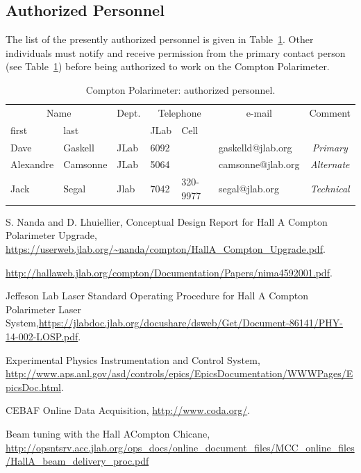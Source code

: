 \subsection{Authorized Personnel}
The list
of the presently authorized personnel is given in Table~\ref{tab:compton:personnel}.
Other individuals must notify and receive permission from
the primary contact person (see Table~\ref{tab:compton:personnel}) before being authorized to work on the Compton Polarimeter.

\begin{table}[ht]
\begin{center}
\begin{tabular}{|ll|l|l|l|l|c|} \hline
  \multicolumn{2}{|c|}{Name} & Dept. & \multicolumn{2}{c|}{Telephone} &
  \multicolumn{1}{c|}{e-mail} & Comment \\
  \cline{4-5}
    first & last & & JLab &  Cell&  & \\
\hline
 {Dave } & {Gaskell} & JLab   & 6092  &   & gaskelld@jlab.org     & \it Primary     \\
   Alexandre & Camsonne           & JLab   & 5064 &  & camsonne@jlab.org     & \it Alternate \\
   Jack   &  Segal           & Jlab   & 7042  &  320-9977& segal@jlab.org     & \it Technical \\
 \hline
\end{tabular}  
\end{center}
\caption[compton Polarimeter: authorized personnel]{
   Compton Polarimeter: authorized personnel. }
\label{tab:compton:personnel}
\end{table}

%
\begin{thebibliography}{99}
 S. Nanda and D. Lhuiellier, Conceptual Design Report  for 
Hall A Compton Polarimeter Upgrade, \url{https://userweb.jlab.org/~nanda/compton/HallA_Compton_Upgrade.pdf}.

 \url{http://hallaweb.jlab.org/compton/Documentation/Papers/nima4592001.pdf}.

 Jeffeson Lab Laser Standard Operating Procedure for Hall A Compton Polarimeter Laser System,\url{https://jlabdoc.jlab.org/docushare/dsweb/Get/Document-86141/PHY-14-002-LOSP.pdf}.

 Experimental Physics Instrumentation and Control System, \url{http://www.aps.anl.gov/asd/controls/epics/EpicsDocumentation/WWWPages/EpicsDoc.html}.

 CEBAF Online Data Acquisition, \url{http://www.coda.org/}.

 Beam tuning with the Hall ACompton Chicane,
\url{http://opsntsrv.acc.jlab.org/ops\_docs/online\_document_files/MCC\_online\_files/HallA\_beam\_delivery\_proc.pdf}
\end{thebibliography}


